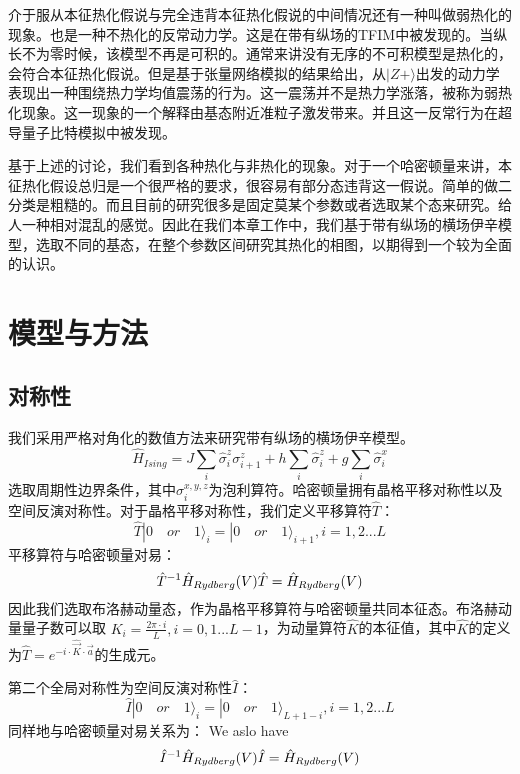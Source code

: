 介于服从本征热化假说与完全违背本征热化假说的中间情况还有一种叫做弱热化的现象。也是一种不热化的反常动力学。这是在带有纵场的TFIM中被发现的。当纵长不为零时候，该模型不再是可积的。通常来讲没有无序的不可积模型是热化的，会符合本征热化假说。但是基于张量网络模拟的结果给出，从$|Z+\rangle$出发的动力学表现出一种围绕热力学均值震荡的行为。这一震荡并不是热力学涨落，被称为弱热化现象。这一现象的一个解释由基态附近准粒子激发带来。并且这一反常行为在超导量子比特模拟中被发现。

基于上述的讨论，我们看到各种热化与非热化的现象。对于一个哈密顿量来讲，本征热化假设总归是一个很严格的要求，很容易有部分态违背这一假说。简单的做二分类是粗糙的。而且目前的研究很多是固定莫某个参数或者选取某个态来研究。给人一种相对混乱的感觉。因此在我们本章工作中，我们基于带有纵场的横场伊辛模型，选取不同的基态，在整个参数区间研究其热化的相图，以期得到一个较为全面的认识。

\section{模型与方法}
\subsection{对称性}
我们采用严格对角化的数值方法来研究带有纵场的横场伊辛模型。
\begin{equation}
\hat{H}_{Ising} = J\sum_{i}\hat{\sigma}^z_i\sigma^z_{i+1} + h\sum_{i}\hat{\sigma}^z_i + g\sum_i\hat{\sigma}^x_i
\label{Ising}
\end{equation}
选取周期性边界条件，其中$\sigma_i^{x,y,z}$为泡利算符。哈密顿量拥有晶格平移对称性以及空间反演对称性。对于晶格平移对称性，我们定义平移算符$\hat{T}$：
\begin{equation}
	\hat{T} |0 \quad or \quad 1 \rangle_{i} =  |0 \quad or \quad 1 \rangle_{i+1}, i=1,2...L
\end{equation}
平移算符与哈密顿量对易：
\begin{equation}
	\hat{T}^{-1}\hat{H}_{Rydberg}(V)\hat{T} = \hat{H}_{Rydberg}(V)\\
\end{equation}
因此我们选取布洛赫动量态，作为晶格平移算符与哈密顿量共同本征态。布洛赫动量量子数可以取 $K_i=\frac{2\pi\cdot i}{L},i=0,1...L-1$，为动量算符$\hat{K}$的本征值，其中$\hat{K}$的定义为$\hat{T} = e^{-i\cdot\hat{\vec{K} }\cdot \vec{a}}$的生成元。

第二个全局对称性为空间反演对称性$\hat{I}$：
\begin{equation}
	\hat{I} |0 \quad or \quad 1 \rangle_{i} =  |0 \quad or \quad 1 \rangle_{L+1-i}, i=1,2...L
\end{equation}
同样地与哈密顿量对易关系为：
We aslo have 
\begin{equation}
	\hat{I}^{-1}\hat{H}_{Rydberg}(V)\hat{I} = \hat{H}_{Rydberg}(V)\\
\end{equation}

